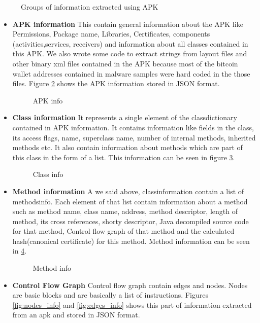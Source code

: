 \documentclass[../main.tex]{subfile}
\begin{document}
		\begin{figure}[H]
			\centering
			\caption{Groups of information extracted using APK}
			\label{fig:info_extracted}
		\end{figure}
		
		
		\begin{itemize}
			\item \textbf{APK information} This contain general information about the APK like Permissions, Package name, Libraries, Certificates, components (activities,services, receivers) and information about all classes contained in this APK. We also wrote some code to extract strings from layout files and other binary xml files contained in the APK because most of the bitcoin wallet addresses contained in malware samples were hard coded in the those files. Figure \ref{fig:apk_info} shows the APK information stored in JSON format.
			\begin{figure}[H]
				\centering
				\caption{APK info}
				\label{fig:apk_info}	
			\end{figure}
			
			\item \textbf{Class information} It represents a single element of the class\textunderscore dictionary contained in APK information. It contains information like fields in the class, its access flags, name, superclass name, number of internal methods, inherited methods etc. It also contain information about methods which are part of this class in the form of a list. This information can be seen in figure \ref{fig:class_info}.
			\begin{figure}[H]
				\centering
				\caption{Class info}
				\label{fig:class_info}	
			\end{figure}
			
			
			\item \textbf{Method information} A we said above, class\textunderscore information contain a list of methods\textunderscore info. Each element of that list contain information about a method such as method name, class name, address, method descriptor, length of method, its cross references, shorty descriptor, Java decompiled source code for that method, Control flow graph of that method and the calculated hash(canonical certificate) for this method. Method information can be seen in \ref{fig:method_info}.
			\begin{figure}[H]
				\centering
				\caption{Method info}
				\label{fig:method_info}	
			\end{figure}
			\item \textbf{Control Flow Graph} Control flow graph contain edges and nodes. Nodes are basic blocks and are basically a list of instructions. Figures \ref{fig:nodes_info} and \ref{fig:edges_info} shows this part of information extracted from an apk and stored in JSON format.


\end{itemize}
\end{document}
